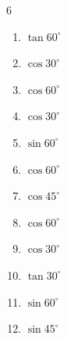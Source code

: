 \begin{multicols}{6}
\begin{enumerate}

  \item $\displaystyle \tan{60^\circ}$


  \item $\displaystyle \cos{30^\circ}$


  \item $\displaystyle \cos{60^\circ}$


  \item $\displaystyle \cos{30^\circ}$


  \item $\displaystyle \sin{60^\circ}$


  \item $\displaystyle \cos{60^\circ}$


\columnbreak %

  \item $\displaystyle \cos{45^\circ}$


  \item $\displaystyle \cos{60^\circ}$


  \item $\displaystyle \cos{30^\circ}$


  \item $\displaystyle \tan{30^\circ}$


  \item $\displaystyle \sin{60^\circ}$


  \item $\displaystyle \sin{45^\circ}$


\end{enumerate}
\end{multicols}
